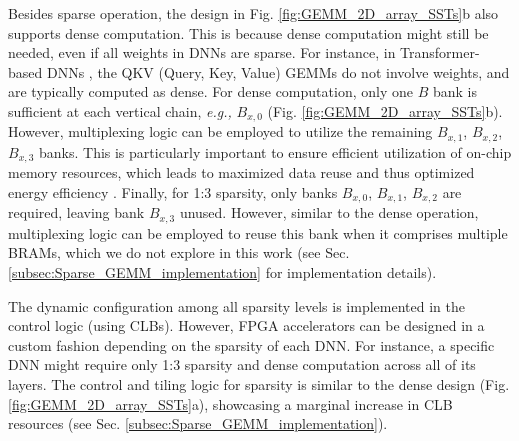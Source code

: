 Besides sparse operation, the design in Fig. \ref{fig:GEMM_2D_array_SSTs}b also supports dense computation.
This is because dense computation might still be needed, even if all weights in DNNs are sparse.
For instance, in Transformer-based DNNs \cite{Attention_all_you_need_2017, BERT_2019, ViT_2020}, the QKV (Query, Key, Value) 
GEMMs do not involve weights, and are typically computed as dense.
For dense computation, only one $B$ bank is sufficient at each vertical chain, \emph{e.g.,} $B_{x,0}$ (Fig. \ref{fig:GEMM_2D_array_SSTs}b).
However, multiplexing logic can be employed to 
utilize the remaining $B_{x,1}$, $B_{x,2}$, $B_{x,3}$ banks.
This is particularly important to ensure efficient utilization of on-chip memory resources, which leads to maximized data reuse and thus optimized energy efficiency \cite{Versal_vs_Stratix_FCCM_2024, MaxEVA_2023}.
Finally, for 1:3 sparsity, only banks $B_{x,0}$, $B_{x,1}$, $B_{x,2}$ are required, leaving bank $B_{x,3}$ unused. 
However, similar to the dense operation, 
multiplexing logic can be employed to reuse this bank when it comprises multiple BRAMs, which we do not explore in this work (see Sec. \ref{subsec:Sparse_GEMM_implementation} for implementation details). 



The dynamic configuration among all sparsity levels 
is implemented in the control logic (using CLBs).
However, FPGA accelerators can be designed in a custom fashion depending on the sparsity of each DNN.
For instance, a specific DNN might require only 1:3 sparsity and dense computation across all of its layers.
The control and tiling logic for sparsity is similar to the dense design (Fig. \ref{fig:GEMM_2D_array_SSTs}a), showcasing a marginal increase in CLB resources (see Sec. \ref{subsec:Sparse_GEMM_implementation}).




